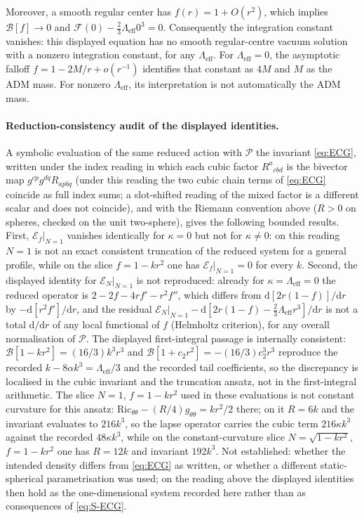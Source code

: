 Moreover, a smooth regular center has \(f(r)=1+O(r^2)\), which
implies \(\mathcal B[f]\to0\) and
\(\mathcal F(0)-\tfrac23\Lambda_{\mathrm{eff}}0^3=0\).
Consequently the integration constant vanishes: this displayed
equation has no smooth regular-centre vacuum solution with a nonzero
integration constant, for any \(\Lambda_{\mathrm{eff}}\). For
\(\Lambda_{\mathrm{eff}}=0\), the asymptotic falloff
\(f=1-2M/r+o(r^{-1})\) identifies that constant as \(4M\) and \(M\)
as the ADM mass. For nonzero \(\Lambda_{\mathrm{eff}}\), its
interpretation is not automatically the ADM mass.

\paragraph{Reduction-consistency audit of the displayed identities.}
A symbolic evaluation of the same reduced action with \(\mathcal P\) the
invariant \eqref{eq:ECG}, written under the index reading in which each
cubic factor \(R^a{}_{cbd}\) is the bivector map \(g^{cp}g^{dq}R_{apbq}\)
(under this reading the two cubic chain terms of \eqref{eq:ECG} coincide
as full index sums; a slot-shifted reading of the mixed factor is a
different scalar and does not coincide), and with the Riemann convention
above (\(R>0\) on spheres, checked on the unit two-sphere), gives the
following bounded results. First, \(\left.\mathcal E_f\right|_{N=1}\)
vanishes identically for \(\kappa=0\) but not for \(\kappa\ne0\): on this
reading \(N=1\) is not an exact consistent truncation of the reduced
system for a general profile, while on the slice \(f=1-kr^2\) one has
\(\left.\mathcal E_f\right|_{N=1}=0\) for every \(k\). Second, the
displayed identity for \(\left.\mathcal E_N\right|_{N=1}\) is not
reproduced: already for \(\kappa=\Lambda_{\mathrm{eff}}=0\) the reduced
operator is \(2-2f-4rf'-r^2f''\), which differs from
\(\mathrm d[2r(1-f)]/\mathrm dr\) by \(-\mathrm d[r^2f']/\mathrm dr\),
and the residual
\(\left.\mathcal E_N\right|_{N=1}-\mathrm d[2r(1-f)-\tfrac23\Lambda_{\mathrm{eff}}r^3]/\mathrm dr\)
is not a total \(\mathrm d/\mathrm dr\) of any local functional of \(f\)
(Helmholtz criterion), for any overall normalisation of \(\mathcal P\).
The displayed first-integral passage is internally consistent:
\(\mathcal B[1-kr^2]=(16/3)k^3r^3\) and
\(\mathcal B[1+c_2r^2]=-(16/3)c_2^3r^3\) reproduce the recorded
\(k-8\alpha k^3=\Lambda_{\mathrm{eff}}/3\) and the recorded tail
coefficients, so the discrepancy is localised in the cubic invariant and
the truncation ansatz, not in the first-integral arithmetic. The slice
\(N=1\), \(f=1-kr^2\) used in these evaluations is not constant curvature
for this ansatz: \(\mathrm{Ric}_{\theta\theta}-(R/4)g_{\theta\theta}=kr^2/2\)
there; on it \(R=6k\) and the invariant evaluates to \(216k^3\), so the
lapse operator carries the cubic term \(216\kappa k^3\) against the
recorded \(48\kappa k^3\), while on the constant-curvature slice
\(N=\sqrt{1-kr^2}\), \(f=1-kr^2\) one has \(R=12k\) and invariant
\(192k^3\). Not established: whether the intended density differs from
\eqref{eq:ECG} as written, or whether a different static-spherical
parametrisation was used; on the reading above the displayed identities
then hold as the one-dimensional system recorded here rather than as
consequences of \eqref{eq:S-ECG}.


